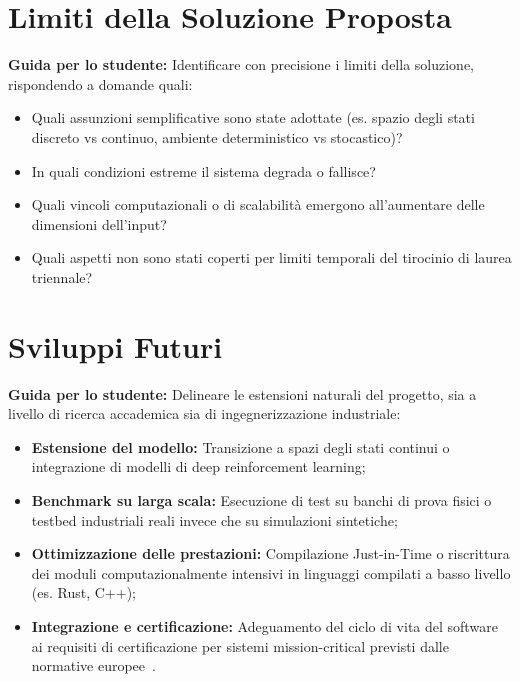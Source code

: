\section{Limiti della Soluzione Proposta}
\label{sec:limiti}

\textbf{Guida per lo studente:} Identificare con precisione i limiti della soluzione, rispondendo a domande quali:
\begin{itemize}
    \item Quali assunzioni semplificative sono state adottate (es. spazio degli stati discreto vs continuo, ambiente deterministico vs stocastico)?
    \item In quali condizioni estreme il sistema degrada o fallisce?
    \item Quali vincoli computazionali o di scalabilità emergono all'aumentare delle dimensioni dell'input?
    \item Quali aspetti non sono stati coperti per limiti temporali del tirocinio di laurea triennale?
\end{itemize}


\section{Sviluppi Futuri}
\label{sec:sviluppi-futuri}

\textbf{Guida per lo studente:} Delineare le estensioni naturali del progetto, sia a livello di ricerca accademica sia di ingegnerizzazione industriale:

\begin{itemize}
    \item \textbf{Estensione del modello:} Transizione a spazi degli stati continui o integrazione di modelli di deep reinforcement learning;
    \item \textbf{Benchmark su larga scala:} Esecuzione di test su banchi di prova fisici o testbed industriali reali invece che su simulazioni sintetiche;
    \item \textbf{Ottimizzazione delle prestazioni:} Compilazione Just-in-Time o riscrittura dei moduli computazionalmente intensivi in linguaggi compilati a basso livello (es. Rust, C++);
    \item \textbf{Integrazione e certificazione:} Adeguamento del ciclo di vita del software ai requisiti di certificazione per sistemi mission-critical previsti dalle normative europee~\cite{en50716, en50128}.
\end{itemize}

